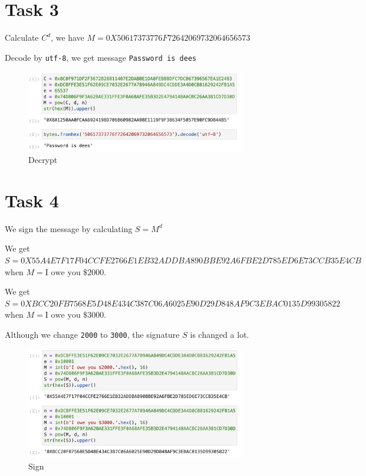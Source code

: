 \documentclass[onecolumn,oneside]{SUSTechHomework}
\begin{document}
  \section*{Task 3}

  Calculate $C^d$, we have $M = 0X50617373776F72642069732064656573$

  Decode by \verb|utf-8|, we get message \verb|Password is dees|

  \begin{figure}[H]
    \centering
    \includegraphics[width=0.85\textwidth]{img/task3_1.png}
    \caption{Decrypt}
  \end{figure}

  \section*{Task 4}

  We sign the message by calculating $S=M^d$

  We get $S=0X55A4E7F17F04CCFE2766E1EB32ADDBA890BBE92A6FBE2D785ED6E73CCB35E4CB$ when $M=\mbox{I owe you \$2000.}$

  We get $S=0XBCC20FB7568E5D48E434C387C06A6025E90D29D848AF9C3EBAC0135D99305822$ when $M=\mbox{I owe you \$3000.}$

  Although we change \verb|2000| to \verb|3000|, the signature $S$ is changed a lot.

  \begin{figure}[H]
    \centering
    \includegraphics[width=0.85\textwidth]{img/task4_1.png}
    \caption{Sign}
  \end{figure}
\end{document}
